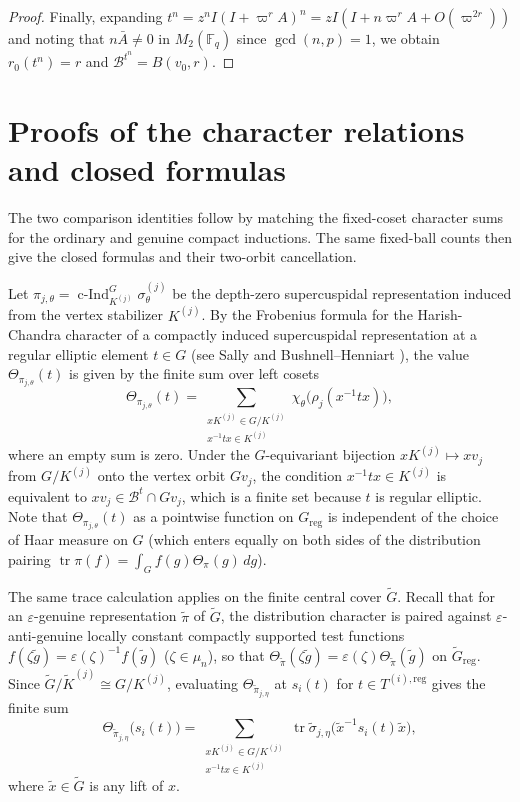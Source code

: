 \documentclass[12pt, letterpaper]{article}
\numberwithin{equation}{section}
\theoremstyle{definition}
\theoremstyle{remark}
\newcommand{\kk}{\mathbb{F}_q}
\newcommand{\wtG}{\widetilde{G}}
\newcommand{\cInd}{\operatorname{c-Ind}}
\newcommand{\tr}{\operatorname{tr}}
\begin{document}
\begin{proof}
Finally, expanding $t^n=z^n I(I+\varpi^r A)^n=zI(I+n\varpi^r A+O(\varpi^{2r}))$ and noting that $n\bar{A}\ne 0$ in $M_2(\kk)$ since $\gcd(n,p)=1$, we obtain $r_0(t^n)=r$ and $\mathscr{B}^{t^n}=B(v_0,r)$.
\end{proof}

\section{Proofs of the character relations and closed formulas}\label{sec:proofs}

The two comparison identities follow by matching the fixed-coset character sums for the ordinary and genuine compact inductions. The same fixed-ball counts then give the closed formulas and their two-orbit cancellation.

Let $\pi_{j,\theta}=\cInd_{K^{(j)}}^G\sigma_\theta^{(j)}$ be the depth-zero supercuspidal representation induced from the vertex stabilizer $K^{(j)}$. By the Frobenius formula for the Harish-Chandra character of a compactly induced supercuspidal representation at a regular elliptic element $t\in G$ (see Sally \cite[Thm.~1.9 and Eq.~(1.10)]{Sa88} and Bushnell--Henniart \cite[Appendix~A, \S A.3, Thm.~A.4]{BH06}), the value $\Theta_{\pi_{j,\theta}}(t)$ is given by the finite sum over left cosets
\begin{equation}\label{eq:frobenius-ordinary}
 \Theta_{\pi_{j,\theta}}(t)
 =\sum_{\substack{xK^{(j)}\in G/K^{(j)}\\ x^{-1}tx\in K^{(j)}}}
  \chi_\theta\bigl(\rho_j(x^{-1}tx)\bigr),
\end{equation}
where an empty sum is zero. Under the $G$-equivariant bijection $xK^{(j)}\mapsto xv_j$ from $G/K^{(j)}$ onto the vertex orbit $Gv_j$, the condition $x^{-1}tx\in K^{(j)}$ is equivalent to $xv_j\in\mathscr{B}^t\cap Gv_j$, which is a finite set because $t$ is regular elliptic. Note that $\Theta_{\pi_{j,\theta}}(t)$ as a pointwise function on $G_{\mathrm{reg}}$ is independent of the choice of Haar measure on $G$ (which enters equally on both sides of the distribution pairing $\tr\pi(f)=\int_G f(g)\Theta_\pi(g)\,dg$).

The same trace calculation applies on the finite central cover $\wtG$. Recall that for an $\varepsilon$-genuine representation $\widetilde{\pi}$ of $\wtG$, the distribution character is paired against $\varepsilon$-anti-genuine locally constant compactly supported test functions $f(\zeta\widetilde{g})=\varepsilon(\zeta)^{-1}f(\widetilde{g})$ ($\zeta\in\mu_n$), so that $\Theta_{\widetilde{\pi}}(\zeta\widetilde{g})=\varepsilon(\zeta)\Theta_{\widetilde{\pi}}(\widetilde{g})$ on $\wtG_{\mathrm{reg}}$. Since $\wtG/\widetilde{K}^{(j)}\cong G/K^{(j)}$, evaluating $\Theta_{\widetilde{\pi}_{j,\eta}}$ at $s_i(t)$ for $t\in T^{(i),\mathrm{reg}}$ gives the finite sum
\begin{equation}\label{eq:frobenius-genuine}
 \Theta_{\widetilde{\pi}_{j,\eta}}\bigl(s_i(t)\bigr)
 =\sum_{\substack{xK^{(j)}\in G/K^{(j)}\\ x^{-1}tx\in K^{(j)}}}
  \tr\widetilde{\sigma}_{j,\eta}\bigl(\widetilde{x}^{-1}s_i(t)\widetilde{x}\bigr),
\end{equation}
where $\widetilde{x}\in\wtG$ is any lift of $x$.
\end{document}
